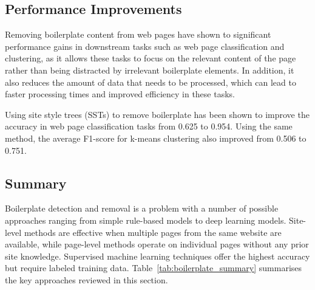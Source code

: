 \subsection{Performance Improvements}\label{subsec:performance-improvements}
Removing boilerplate content from web pages have shown to significant performance gains in downstream tasks such as
web page classification and clustering, as it allows these tasks to focus on the relevant content of the page rather than being distracted by irrelevant boilerplate elements.
In addition, it also reduces the amount of data that needs to be processed, which can lead to faster processing times and improved efficiency in these tasks.

Using site style trees (SSTs) to remove boilerplate has been shown to improve the accuracy in web page classification tasks from
0.625 to 0.954\cite{yi2003eliminating}.
Using the same method, the average F1-score for k-means clustering also improved from 0.506 to 0.751.

\subsection{Summary}\label{subsec:boilerplate_summary}

Boilerplate detection and removal is a problem with a number of possible approaches ranging from simple rule-based models to deep learning models.
Site-level methods are effective when multiple pages from the same website are available, while page-level methods operate on individual pages without any prior site knowledge.
Supervised machine learning techniques offer the highest accuracy but require labeled training data.
Table~\ref{tab:boilerplate_summary} summarises the key approaches reviewed in this section.

